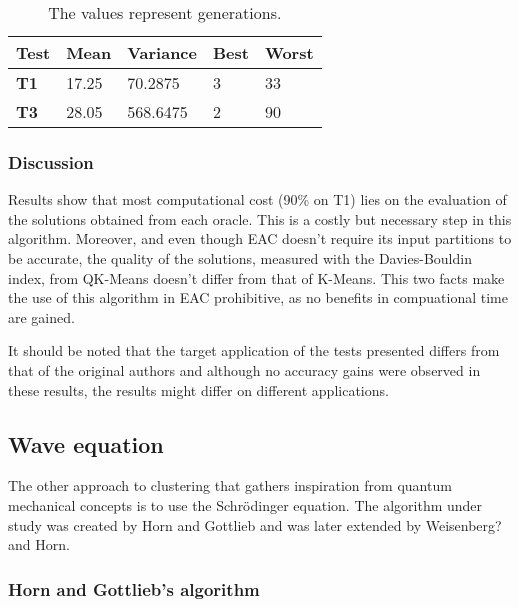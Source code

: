 \documentclass[10pt,a4paper,final]{article}
\begin{document}

\begin{table}[h]
\caption{The values represent generations.}
\begin{tabular}{|l|l|l|l|l|}
\hline
\textbf{Test} & \textbf{Mean} & \textbf{Variance} & \textbf{Best} & \textbf{Worst} \\ \hline
\textbf{T1}   & 17.25         & 70.2875           & 3             & 33             \\ \hline
\textbf{T3}   & 28.05         & 568.6475          & 2             & 90             \\ \hline
\end{tabular}
\label{tab:db_index_t1_t3}
\end{table}

\subsubsection{Discussion}

Results show that most computational cost (90\% on T1) lies on the evaluation of the solutions obtained from each oracle. This is a costly but necessary step in this algorithm. Moreover, and even though EAC doesn't require its input partitions to be accurate, the quality of the solutions, measured with the Davies-Bouldin index, from QK-Means doesn't differ from that of K-Means. This two facts make the use of this algorithm in EAC prohibitive, as no benefits in compuational time are gained.

It should be noted that the target application of the tests presented differs from that of the original authors and although no accuracy gains were observed in these results, the results might differ on different applications.

\subsection{Wave equation}

The other approach to clustering that gathers inspiration from quantum mechanical concepts is to use the Schrödinger equation. The algorithm under study was created by Horn and Gottlieb and was later extended by Weisenberg? and Horn.


\subsubsection{Horn and Gottlieb's algorithm}
\end{document}
